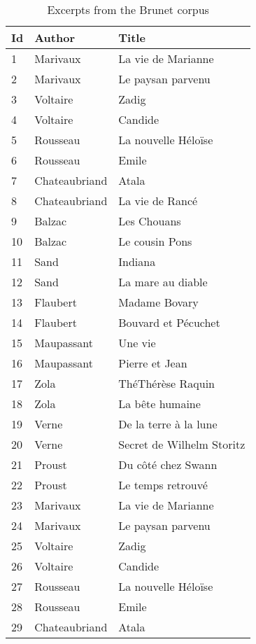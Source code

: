 \begin{table}[H]
  \small
  \centering
  \caption{Excerpts from the Brunet corpus}
  \label{tbl:brunet_corpus}

  \begin{tabular}{l l l}
    \toprule
    \textbf{Id} &
    \textbf{Author} &
    \textbf{Title} \\
    \midrule
    1 & Marivaux & La vie de Marianne \\
    2 & Marivaux & Le paysan parvenu \\
    3 & Voltaire & Zadig \\
    4 & Voltaire & Candide \\
    5 & Rousseau & La nouvelle Héloïse \\
    6 & Rousseau & Emile \\
    7 & Chateaubriand & Atala \\
    8 & Chateaubriand & La vie de Rancé \\
    9 & Balzac & Les Chouans \\
    10 & Balzac & Le cousin Pons \\
    11 & Sand & Indiana \\
    12 & Sand & La mare au diable \\
    13 & Flaubert & Madame Bovary \\
    14 & Flaubert & Bouvard et Pécuchet \\
    15 & Maupassant & Une vie \\
    16 & Maupassant & Pierre et Jean \\
    17 & Zola & ThéThérèse Raquin \\
    18 & Zola & La bête humaine \\
    19 & Verne & De la terre à la lune \\
    20 & Verne & Secret de Wilhelm Storitz \\
    21 & Proust & Du côté chez Swann \\
    22 & Proust & Le temps retrouvé \\
    23 & Marivaux & La vie de Marianne \\
    24 & Marivaux & Le paysan parvenu \\
    25 & Voltaire & Zadig \\
    26 & Voltaire & Candide \\
    27 & Rousseau & La nouvelle Héloïse \\
    28 & Rousseau & Emile \\
    29 & Chateaubriand & Atala \\

\end{tabular}
\end{table}
